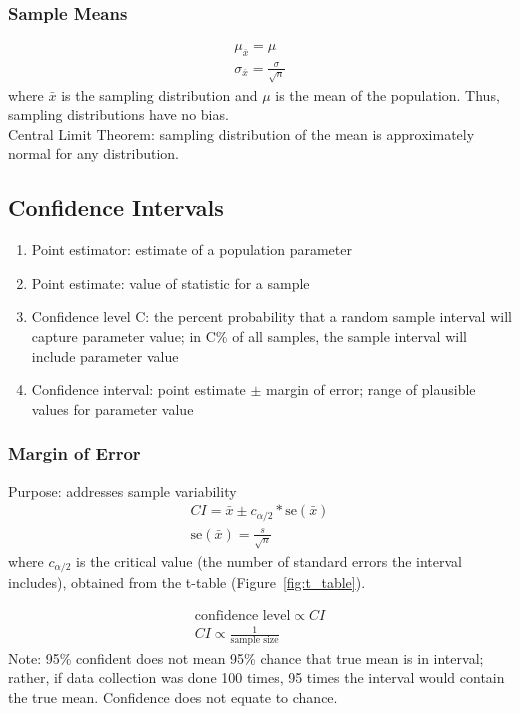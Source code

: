 \documentclass[12pt]{article}
\numberwithin{equation}{section}
\begin{document}
\subsubsection{Sample Means}
\begin{gather}
    \mu_{\bar{x}}=\mu \\
    \sigma_{\bar{x}}=\frac{\sigma}{\sqrt{n}}
\end{gather}
where $\bar{x}$ is the sampling distribution and $\mu$ is the mean of the population. Thus, sampling distributions have no bias. \\[0.5cm]
Central Limit Theorem: sampling distribution of the mean is approximately normal for any distribution.

\subsection{Confidence Intervals}
\label{sec:confidence_intervals}
\begin{enumerate}
    \item Point estimator: estimate of a population parameter
    \item Point estimate: value of statistic for a sample
    \item Confidence level C: the percent probability that a random sample interval will capture parameter value; in C$\%$ of all samples, the sample interval will include parameter value
    \item Confidence interval: point estimate $\pm$ margin of error; range of plausible values for parameter value
\end{enumerate}

\subsubsection{Margin of Error}
Purpose: addresses sample variability
\begin{gather}
    CI = \bar{x} \pm c_{\alpha/2}*\text{se}(\bar{x}) \\
    \text{se}(\bar{x}) = \frac{s}{\sqrt{n}}
\end{gather}
where $c_{\alpha/2}$ is the critical value (the number of standard errors the interval includes), obtained from the t-table (Figure~\ref{fig:t_table}).

\begin{gather}
    \text{confidence level} \propto CI \\
    CI \propto \frac{1}{\text{sample size}}
\end{gather}
Note: 95\% confident does not mean 95\% chance that true mean is in interval; rather, if data collection was done 100 times, 95 times the interval would contain the true mean. Confidence does not equate to chance.
\end{document}
